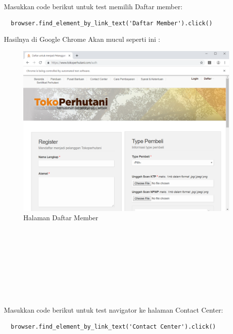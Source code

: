 Masukkan code berikut untuk test memilih Daftar member:
\begin{verbatim}
  browser.find_element_by_link_text('Daftar Member').click()
\end{verbatim}

Hasilnya  di Google Chrome Akan mucul seperti ini :
\begin{figure}[h]
\centering
\includegraphics[scale=0.3]{figures/3daftar.PNG}
\caption{Halaman Daftar Member}
\end{figure}
\\\\\\\\\\\\\\\\

Masukkan code berikut untuk test navigator ke halaman Contact Center:
\begin{verbatim}
  browser.find_element_by_link_text('Contact Center').click()
\end{verbatim}

